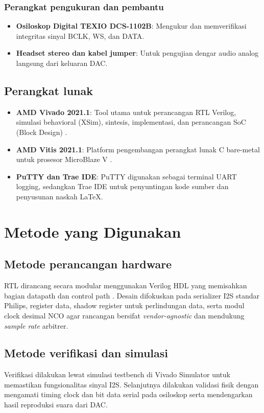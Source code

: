 \subsubsection{Perangkat pengukuran dan pembantu}
\begin{itemize}
    \item \textbf{Osiloskop Digital TEXIO DCS-1102B}: Mengukur dan memverifikasi integritas sinyal BCLK, WS, dan DATA.
    \item \textbf{Headset stereo dan kabel jumper}: Untuk pengujian dengar audio analog langsung dari keluaran DAC.
\end{itemize}

\subsection{Perangkat lunak}
\begin{itemize}
    \item \textbf{AMD Vivado 2021.1}: Tool utama untuk perancangan RTL Verilog, simulasi behavioral (XSim), sintesis, implementasi, dan perancangan SoC (Block Design) \citep{xilinx_vivado_design_suite_2021}.
    \item \textbf{AMD Vitis 2021.1}: Platform pengembangan perangkat lunak C bare-metal untuk prosesor MicroBlaze V \citep{xilinx_vitis_embedded_2021}.
    \item \textbf{PuTTY dan Trae IDE}: PuTTY digunakan sebagai terminal UART logging, sedangkan Trae IDE untuk penyuntingan kode sumber dan penyusunan naskah LaTeX.
\end{itemize}

\section{Metode yang Digunakan}

\subsection{Metode perancangan hardware}
RTL dirancang secara modular menggunakan Verilog HDL yang memisahkan bagian datapath dan control path \citep{palnitkar_verilog_2003}. Desain difokuskan pada serializer I2S standar Philips, register data, shadow register untuk perlindungan data, serta modul clock desimal NCO agar rancangan bersifat \textit{vendor-agnostic} dan mendukung \textit{sample rate} arbitrer.

\subsection{Metode verifikasi dan simulasi}
Verifikasi dilakukan lewat simulasi testbench di Vivado Simulator untuk memastikan fungsionalitas sinyal I2S. Selanjutnya dilakukan validasi fisik dengan mengamati timing clock dan bit data serial pada osiloskop serta mendengarkan hasil reproduksi suara dari DAC.

